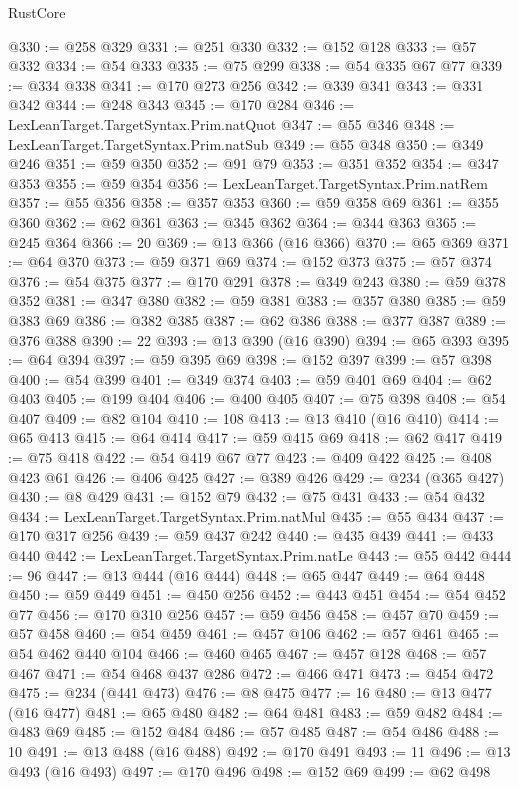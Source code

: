 \begin{lexlean}{RustCore}
\begin{coremodule}
@330 := @258 @329
@331 := @251 @330
@332 := @152 @128
@333 := @57 @332
@334 := @54 @333
@335 := @75 @299
@338 := @54 @335 @67 @77
@339 := @334 @338
@341 := @170 @273 @256
@342 := @339 @341
@343 := @331 @342
@344 := @248 @343
@345 := @170 @284
@346 := LexLeanTarget.TargetSyntax.Prim.natQuot
@347 := @55 @346
@348 := LexLeanTarget.TargetSyntax.Prim.natSub
@349 := @55 @348
@350 := @349 @246
@351 := @59 @350
@352 := @91 @79
@353 := @351 @352
@354 := @347 @353
@355 := @59 @354
@356 := LexLeanTarget.TargetSyntax.Prim.natRem
@357 := @55 @356
@358 := @357 @353
@360 := @59 @358 @69
@361 := @355 @360
@362 := @62 @361
@363 := @345 @362
@364 := @344 @363
@365 := @245 @364
@366 := 20
@369 := @13 @366 (@16 @366)
@370 := @65 @369
@371 := @64 @370
@373 := @59 @371 @69
@374 := @152 @373
@375 := @57 @374
@376 := @54 @375
@377 := @170 @291
@378 := @349 @243
@380 := @59 @378 @352
@381 := @347 @380
@382 := @59 @381
@383 := @357 @380
@385 := @59 @383 @69
@386 := @382 @385
@387 := @62 @386
@388 := @377 @387
@389 := @376 @388
@390 := 22
@393 := @13 @390 (@16 @390)
@394 := @65 @393
@395 := @64 @394
@397 := @59 @395 @69
@398 := @152 @397
@399 := @57 @398
@400 := @54 @399
@401 := @349 @374
@403 := @59 @401 @69
@404 := @62 @403
@405 := @199 @404
@406 := @400 @405
@407 := @75 @398
@408 := @54 @407
@409 := @82 @104
@410 := 108
@413 := @13 @410 (@16 @410)
@414 := @65 @413
@415 := @64 @414
@417 := @59 @415 @69
@418 := @62 @417
@419 := @75 @418
@422 := @54 @419 @67 @77
@423 := @409 @422
@425 := @408 @423 @61
@426 := @406 @425
@427 := @389 @426
@429 := @234 (@365 @427)
@430 := @8 @429
@431 := @152 @79
@432 := @75 @431
@433 := @54 @432
@434 := LexLeanTarget.TargetSyntax.Prim.natMul
@435 := @55 @434
@437 := @170 @317 @256
@439 := @59 @437 @242
@440 := @435 @439
@441 := @433 @440
@442 := LexLeanTarget.TargetSyntax.Prim.natLe
@443 := @55 @442
@444 := 96
@447 := @13 @444 (@16 @444)
@448 := @65 @447
@449 := @64 @448
@450 := @59 @449
@451 := @450 @256
@452 := @443 @451
@454 := @54 @452 @77
@456 := @170 @310 @256
@457 := @59 @456
@458 := @457 @70
@459 := @57 @458
@460 := @54 @459
@461 := @457 @106
@462 := @57 @461
@465 := @54 @462 @440 @104
@466 := @460 @465
@467 := @457 @128
@468 := @57 @467
@471 := @54 @468 @437 @286
@472 := @466 @471
@473 := @454 @472
@475 := @234 (@441 @473)
@476 := @8 @475
@477 := 16
@480 := @13 @477 (@16 @477)
@481 := @65 @480
@482 := @64 @481
@483 := @59 @482
@484 := @483 @69
@485 := @152 @484
@486 := @57 @485
@487 := @54 @486
@488 := 10
@491 := @13 @488 (@16 @488)
@492 := @170 @491
@493 := 11
@496 := @13 @493 (@16 @493)
@497 := @170 @496
@498 := @152 @69
@499 := @62 @498

\end{coremodule}
\end{lexlean}
